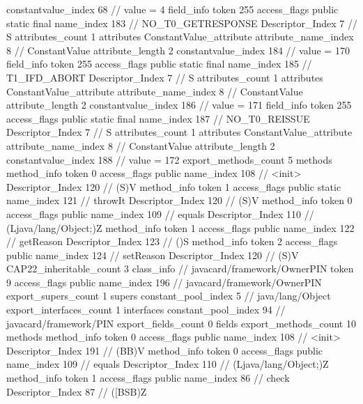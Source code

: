 {{{{{{{					constantvalue_index	68		// value = 4
				}
				}
			}
			field_info {
				token	255
				access_flags	public static final
				name_index	183		// NO_T0_GETRESPONSE
				Descriptor_Index	7		// S
				attributes_count	1
				attributes {
				ConstantValue_attribute {
					attribute_name_index	8		// ConstantValue
					attribute_length	2
					constantvalue_index	184		// value = 170
				}
				}
			}
			field_info {
				token	255
				access_flags	public static final
				name_index	185		// T1_IFD_ABORT
				Descriptor_Index	7		// S
				attributes_count	1
				attributes {
				ConstantValue_attribute {
					attribute_name_index	8		// ConstantValue
					attribute_length	2
					constantvalue_index	186		// value = 171
				}
				}
			}
			field_info {
				token	255
				access_flags	public static final
				name_index	187		// NO_T0_REISSUE
				Descriptor_Index	7		// S
				attributes_count	1
				attributes {
				ConstantValue_attribute {
					attribute_name_index	8		// ConstantValue
					attribute_length	2
					constantvalue_index	188		// value = 172
				}
				}
			}
			}
			export_methods_count	5
			methods {
				method_info {
					token	0
					access_flags	public
					name_index	108		// <init>
					Descriptor_Index	120		// (S)V
				}
				method_info {
					token	1
					access_flags	public static
					name_index	121		// throwIt
					Descriptor_Index	120		// (S)V
				}
				method_info {
					token	0
					access_flags	public
					name_index	109		// equals
					Descriptor_Index	110		// (Ljava/lang/Object;)Z
				}
				method_info {
					token	1
					access_flags	public
					name_index	122		// getReason
					Descriptor_Index	123		// ()S
				}
				method_info {
					token	2
					access_flags	public
					name_index	124		// setReason
					Descriptor_Index	120		// (S)V
				}
			}
			CAP22_inheritable_count	3
		}
		class_info {		// javacard/framework/OwnerPIN
			token	9
			access_flags	public
			name_index	196		// javacard/framework/OwnerPIN
			export_supers_count	1
			supers {
				constant_pool_index	5		// java/lang/Object
			}
			export_interfaces_count	1
			interfaces {
				constant_pool_index	94		// javacard/framework/PIN
			}
			export_fields_count	0
			fields {
			}
			export_methods_count	10
			methods {
				method_info {
					token	0
					access_flags	public
					name_index	108		// <init>
					Descriptor_Index	191		// (BB)V
				}
				method_info {
					token	0
					access_flags	public
					name_index	109		// equals
					Descriptor_Index	110		// (Ljava/lang/Object;)Z
				}
				method_info {
					token	1
					access_flags	public
					name_index	86		// check
					Descriptor_Index	87		// ([BSB)Z
}}}}}
